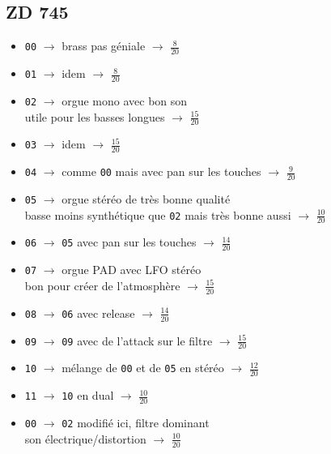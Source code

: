 \documentclass[a4paper, 13pt]{article}
\begin{document}
\subsection*{ZD 745}
\begin{itemize}
    \item \texttt{00} $\rightarrow$ brass pas géniale $\rightarrow$ \Large{$\frac{8}{20}$} \normalsize \vspace{0.2cm}
    \item \texttt{01} $\rightarrow$ idem $\rightarrow$ \Large{$\frac{8}{20}$} \normalsize \vspace{0.2cm}
    \item \texttt{02} $\rightarrow$ orgue mono avec bon son \\ utile pour les basses longues $\rightarrow$ \Large{$\frac{15}{20}$} \normalsize \vspace{0.2cm}
    \item \texttt{03} $\rightarrow$ idem $\rightarrow$ \Large{$\frac{15}{20}$} \normalsize \vspace{0.2cm}
    \item \texttt{04} $\rightarrow$ comme \texttt{00} mais avec pan sur les touches $\rightarrow$ \Large{$\frac{9}{20}$} \normalsize \vspace{0.2cm}
    \item \texttt{05} $\rightarrow$ orgue stéréo de très bonne qualité \\
    basse moins synthétique que \texttt{02} mais très bonne aussi $\rightarrow$ \Large{$\frac{10}{20}$} \normalsize \vspace{0.2cm}
    \item \texttt{06} $\rightarrow$ \texttt{05} avec pan sur les touches $\rightarrow$ \Large{$\frac{14}{20}$} \normalsize \vspace{0.2cm}
    \item \texttt{07} $\rightarrow$ orgue PAD avec LFO stéréo \\ bon pour créer de l'atmosphère $\rightarrow$ \Large{$\frac{15}{20}$} \normalsize \vspace{0.2cm}
    \item \texttt{08} $\rightarrow$ \texttt{06} avec release $\rightarrow$ \Large{$\frac{14}{20}$} \normalsize \vspace{0.2cm}
    \item \texttt{09} $\rightarrow$ \texttt{09} avec de l'attack sur le filtre $\rightarrow$ \Large{$\frac{15}{20}$} \normalsize \vspace{0.2cm}
    \item \texttt{10} $\rightarrow$ mélange de \texttt{00} et de \texttt{05} en stéréo $\rightarrow$ \Large{$\frac{12}{20}$} \normalsize \vspace{0.2cm}
    \item \texttt{11} $\rightarrow$ \texttt{10} en dual $\rightarrow$ \Large{$\frac{10}{20}$} \normalsize \vspace{0.2cm}
    \item \texttt{00} $\rightarrow$ \texttt{02} modifié ici, filtre dominant \\ son électrique/distortion $\rightarrow$ \Large{$\frac{10}{20}$} \normalsize \vspace{0.2cm}
\end{itemize}
\end{document}
